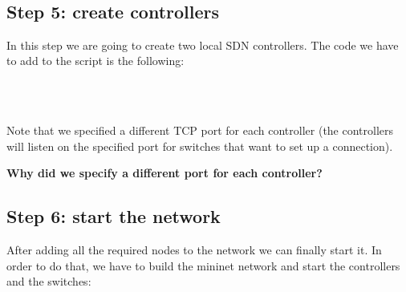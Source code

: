  \\
 \\
 \\
 \\



\subsection*{Step 5: create controllers} \label{sec:step-5}
In this step we are going to create two local SDN controllers. The code we have to
add to the script is the following:

 \\
 \\

Note that we specified a different TCP port for each controller (the controllers
will listen on the specified port for switches that want to set up a connection).

\textbf{Why did we specify a different port for each controller?}

\hrulefill

\hrulefill


\subsection*{Step 6: start the network}
After adding all the required nodes to the network we can finally start it. In order
to do that, we have to build the mininet network and start the controllers and the
switches:

 \\
 \\
 \\
 \\
 \\

